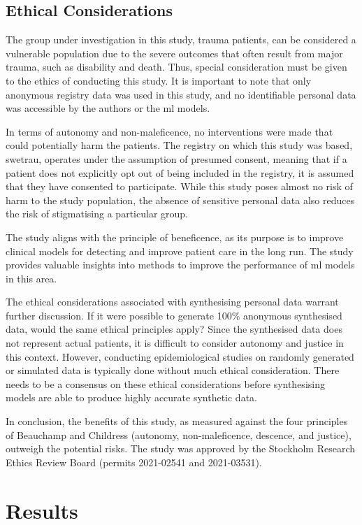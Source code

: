 \documentclass[12pt, letterpaper]{article}
\begin{document}
\subsection{Ethical Considerations}
The group under investigation in this study, trauma patients, can be considered a vulnerable population due to the severe outcomes that often result from major trauma, such as disability and death. Thus, special consideration must be given to the ethics of conducting this study. It is important to note that only anonymous registry data was used in this study, and no identifiable personal data was accessible by the authors or the \acrshort{ml} models.

In terms of autonomy and non-maleficence, no interventions were made that could potentially harm the patients. The registry on which this study was based, \acrshort{swetrau}, operates under the assumption of presumed consent, meaning that if a patient does not explicitly opt out of being included in the registry, it is assumed that they have consented to participate. While this study poses almost no risk of harm to the study population, the absence of sensitive personal data also reduces the risk of stigmatising a particular group.

The study aligns with the principle of beneficence, as its purpose is to improve clinical models for detecting  and improve patient care in the long run. The study provides valuable insights into methods to improve the performance of \acrshort{ml} models in this area.

The ethical considerations associated with synthesising personal data warrant further discussion. If it were possible to generate 100\% anonymous synthesised data, would the same ethical principles apply? Since the synthesised data does not represent actual patients, it is difficult to consider autonomy and justice in this context. However, conducting epidemiological studies on randomly generated or simulated data is typically done without much ethical consideration. There needs to be a consensus on these ethical considerations before synthesising models are able to produce highly accurate synthetic data.

In conclusion, the benefits of this study, as measured against the four principles of Beauchamp and Childress (autonomy, non-maleficence, descence, and justice), outweigh the potential risks. The study was approved by the Stockholm Research Ethics Review Board (permits 2021-02541 and 2021-03531).

\section{Results}
\end{document}
